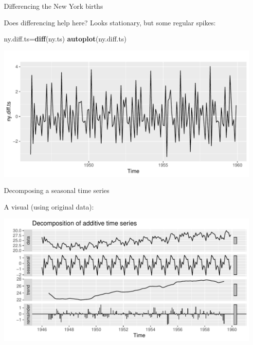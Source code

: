 \documentclass[ignorenonframetext,]{beamer}
\newenvironment{Shaded}{\begin{snugshade}}{\end{snugshade}}
\newcommand{\KeywordTok}[1]{\textcolor[rgb]{0.13,0.29,0.53}{\textbf{#1}}}
\newcommand{\NormalTok}[1]{#1}
\newcommand{\OperatorTok}[1]{\textcolor[rgb]{0.81,0.36,0.00}{\textbf{#1}}}
\newcommand{\StringTok}[1]{\textcolor[rgb]{0.31,0.60,0.02}{#1}}
\begin{document}
\begin{frame}[fragile]{Differencing the New York births}
\protect\hypertarget{differencing-the-new-york-births}{}

Does differencing help here? Looks stationary, but some regular spikes:

\begin{Shaded}
\begin{Highlighting}[]
\NormalTok{ny.diff.ts=}\KeywordTok{diff}\NormalTok{(ny.ts)}
\KeywordTok{autoplot}\NormalTok{(ny.diff.ts)}
\end{Highlighting}
\end{Shaded}

\includegraphics{figure/unnamed-chunk-523-1.pdf}

\end{frame}

\begin{frame}[fragile]{Decomposing a seasonal time series}
\protect\hypertarget{decomposing-a-seasonal-time-series}{}

A visual (using original data):

\begin{Shaded}
\end{Shaded}

\includegraphics{figure/unnamed-chunk-524-1.pdf}

\end{frame}
\end{document}
